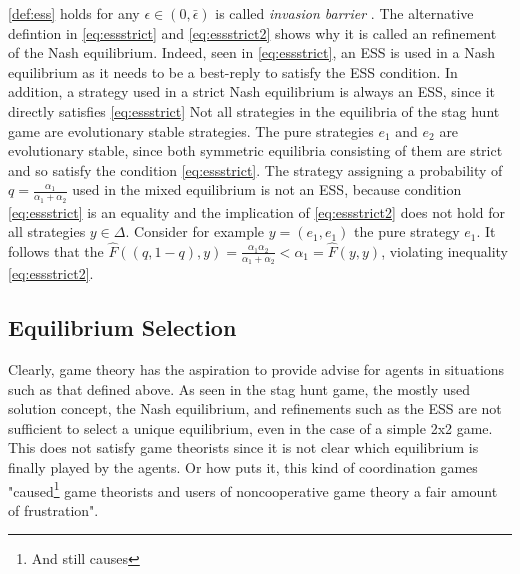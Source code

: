 \documentclass[11pt]{article}
\begin{document}
\ref{def:ess} holds for any $\epsilon \in (0,\bar{\epsilon})$ is called  
\textit{invasion barrier} \cite{weibull_evolutionary_1997}. 
The alternative defintion in \eqref{eq:essstrict} and \eqref{eq:essstrict2}
shows why it is called an refinement of the Nash equilibrium. Indeed,
seen in \eqref{eq:essstrict}, an ESS is used in a Nash equilibrium as it 
needs to be a best-reply to satisfy the ESS condition. In addition, 
a strategy used in a strict Nash equilibrium is always an ESS, 
since it directly satisfies 
\eqref{eq:essstrict}
Not all strategies in the equilibria of the stag hunt game are evolutionary
stable strategies. The pure strategies $e_1$ and $e_2$ are evolutionary stable,
since both symmetric equilibria consisting of them are strict and so 
satisfy the condition \eqref{eq:essstrict}. The strategy assigning 
a probability of $q=\frac{\alpha_1}{\alpha_1 + \alpha_2}$ used in the 
mixed equilibrium is not an ESS, because condition \eqref{eq:essstrict} is
an equality and the implication of \eqref{eq:essstrict2} does not hold for all
strategies $y \in \Delta$.
Consider for example $y =(e_1,e_1)$ the pure strategy $e_1$. It follows that
the $\hat{F}((q,1-q),y) = \frac{\alpha_1 \alpha_2}{\alpha_1+\alpha_2}
< \alpha_1 = \hat{F}(y,y)$, violating inequality \eqref{eq:essstrict2}.

\subsection{Equilibrium Selection}
\label{sec:equilibriumselection}
Clearly, game theory has the aspiration to provide advise for agents in 
situations such as that defined above.
As seen in the stag hunt game, the mostly used solution concept, 
the Nash equilibrium, and refinements such as the ESS are
not sufficient to select a unique equilibrium, even in the case of a simple
2x2 game. This does not satisfy game theorists since it is not clear which
equilibrium is finally played by the agents. Or how \cite{weibull} puts it,
this kind of coordination games "caused\footnote{And still causes} game theorists and users of 
noncooperative game theory a fair amount of frustration". 
\end{document}
